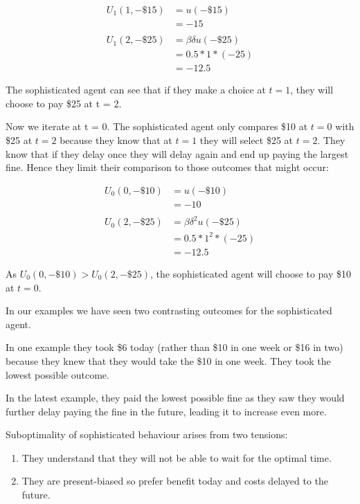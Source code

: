 \documentclass[
  letterpaper,
  DIV=11,
  numbers=noendperiod]{scrreprt}
\begin{document}
\begin{align*}
U_1(1,-\$15)&=u(-\$15) \\
&=-15 \\
\\
U_1(2,-\$25)&=\beta\delta u(-\$25) \\
&=0.5*1*(-25) \\
&=-12.5
\end{align*}

The sophisticated agent can see that if they make a choice at \(t=1\),
they will choose to pay \$25 at t = 2.

Now we iterate at t = 0. The sophisticated agent only compares \$10 at
\(t=0\) with \$25 at \(t=2\) because they know that at \(t=1\) they will
select \$25 at \(t=2\). They know that if they delay once they will
delay again and end up paying the largest fine. Hence they limit their
comparison to those outcomes that might occur:

\begin{align*}
U_0(0,-\$10)&=u(-\$10) \\
&=-10 \\
\\
U_0(2,-\$25)&=\beta\delta^2 u(-\$25) \\
&=0.5*1^2*(-25) \\
&=-12.5
\end{align*}

As \(U_0(0,-\$10)>U_0(2,-\$25)\), the sophisticated agent will choose to
pay \$10 at \(t=0\).

In our examples we have seen two contrasting outcomes for the
sophisticated agent.

In one example they took \$6 today (rather than \$10 in one week or \$16
in two) because they knew that they would take the \$10 in one week.
They took the lowest possible outcome.

In the latest example, they paid the lowest possible fine as they saw
they would further delay paying the fine in the future, leading it to
increase even more.

Suboptimality of sophisticated behaviour arises from two tensions:

\begin{enumerate}
\def\labelenumi{\arabic{enumi}.}
\item
  They understand that they will not be able to wait for the optimal
  time.
\item
  They are present-biased so prefer benefit today and costs delayed to
  the future.
\end{enumerate}
\end{document}
